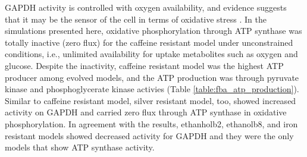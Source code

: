 GAPDH activity is controlled with oxygen availability, and evidence suggests that it may be the sensor of the cell in terms of oxidative stress \cite{chuang2005glyceraldehyde}. In the simulations presented here, oxidative phosphorylation through ATP synthase was totally inactive (zero flux) for the caffeine resistant model under unconstrained conditions, i.e., unlimited availability for uptake metabolites such as oxygen and glucose. Despite the inactivity, caffeine resistant model was the highest ATP producer among evolved models, and the ATP production was through pyruvate kinase and phosphoglycerate kinase activies (Table \ref{table:fba_atp_production}). Similar to caffeine resistant model, silver resistant model, too, showed increased activity on GAPDH and carried zero flux through ATP synthase in oxidative phosphorylation. In agreement with the results, ethanholb2, ethanolb8, and iron resistant models showed decreased activity for GAPDH and they were the only models that show ATP synthase activity.
